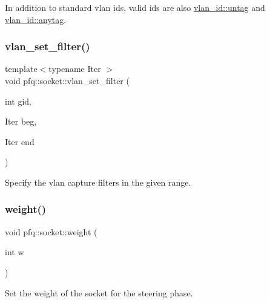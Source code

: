 In addition to standard vlan ids, valid ids are also \hyperlink{structpfq_1_1vlan__id_a9e30bbd86d62e58ae5e5e080f7e046df}{vlan\+\_\+id\+::untag} and \hyperlink{structpfq_1_1vlan__id_affdae3b855070274e64b5d5696d6d72e}{vlan\+\_\+id\+::anytag}. \mbox{\label{classpfq_1_1socket_aee0fbc6a5f899d081c659dbaa4a4a235}} 
\subsubsection{\texorpdfstring{vlan\+\_\+set\+\_\+filter()}{vlan\_set\_filter()}\hspace{0.1cm}{\footnotesize\ttfamily [2/2]}}
{\footnotesize\ttfamily template$<$typename Iter $>$ \\
void pfq\+::socket\+::vlan\+\_\+set\+\_\+filter (\begin{DoxyParamCaption}\item[{int}]{gid,  }\item[{Iter}]{beg,  }\item[{Iter}]{end }\end{DoxyParamCaption})\hspace{0.3cm}{\ttfamily [inline]}}



Specify the vlan capture filters in the given range. 

\mbox{\label{classpfq_1_1socket_ad843f3354b92083f01be9b5055f211b8}} 
\subsubsection{\texorpdfstring{weight()}{weight()}\hspace{0.1cm}{\footnotesize\ttfamily [1/2]}}
{\footnotesize\ttfamily void pfq\+::socket\+::weight (\begin{DoxyParamCaption}\item[{int}]{w }\end{DoxyParamCaption})\hspace{0.3cm}{\ttfamily [inline]}}



Set the weight of the socket for the steering phase. 

